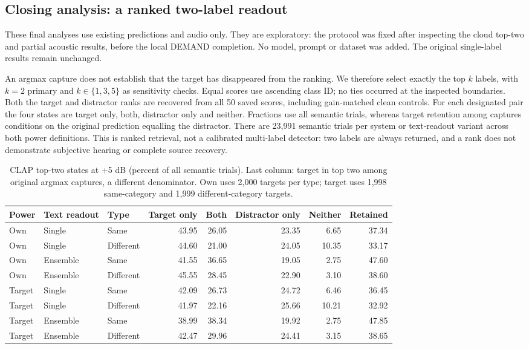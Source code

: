\subsection{Closing analysis: a ranked two-label readout}
These final analyses use existing predictions and audio only. They are exploratory:
the protocol was fixed after inspecting the cloud top-two and partial acoustic
results, before the local DEMAND completion. No model, prompt or dataset was
added. The original single-label results remain unchanged.

An argmax capture does not establish that the target has disappeared from the
ranking. We therefore select exactly the top $k$ labels, with $k=2$ primary and
$k\in\{1,3,5\}$ as sensitivity checks. Equal scores use ascending class ID; no
ties occurred at the inspected boundaries. Both the target and distractor ranks
are recovered from all 50 saved scores, including gain-matched clean controls.
For each designated pair the four states are target only, both, distractor only
and neither. Fractions use all semantic trials, whereas target retention among
captures conditions on the original prediction equalling the distractor.
There are 23,991 semantic trials per system or text-readout variant across both
power definitions. This is ranked retrieval, not a calibrated multi-label
detector: two labels are always returned, and a rank does not demonstrate
subjective hearing or complete source recovery.

\begin{table}[htbp]\centering\small
\caption{CLAP top-two states at +5 dB (percent of all semantic trials). Last column: target in top two among original argmax captures, a different denominator. Own uses 2,000 targets per type; target uses 1,998 same-category and 1,999 different-category targets.}
\label{tab:top2}\begin{tabular}{lllrrrrr}\toprule
Power & Text readout & Type & Target only & Both & Distractor only & Neither & Retained\\\midrule
Own & Single & Same & 43.95 & 26.05 & 23.35 & 6.65 & 37.34 \\
Own & Single & Different & 44.60 & 21.00 & 24.05 & 10.35 & 33.17 \\
Own & Ensemble & Same & 41.55 & 36.65 & 19.05 & 2.75 & 47.60 \\
Own & Ensemble & Different & 45.55 & 28.45 & 22.90 & 3.10 & 38.60 \\
\midrule
Target & Single & Same & 42.09 & 26.73 & 24.72 & 6.46 & 36.45 \\
Target & Single & Different & 41.97 & 22.16 & 25.66 & 10.21 & 32.92 \\
Target & Ensemble & Same & 38.99 & 38.34 & 19.92 & 2.75 & 47.85 \\
Target & Ensemble & Different & 42.47 & 29.96 & 24.41 & 3.15 & 38.65 \\
\bottomrule\end{tabular}\end{table}

